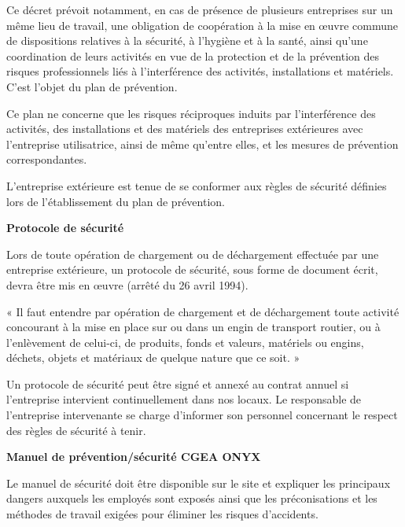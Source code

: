 Ce décret prévoit notamment, en cas de présence de plusieurs entreprises sur un même lieu de travail, une obligation de coopération à la mise en œuvre commune de dispositions relatives à la sécurité, à l’hygiène et à la santé, ainsi qu’une coordination de leurs activités en vue de la protection et de la prévention des risques professionnels liés à l’interférence des activités, installations et matériels. C’est l’objet du plan de prévention.

\vspace{0.3cm} 

Ce plan ne concerne que les risques réciproques induits par l’interférence des activités, des installations et des matériels des entreprises extérieures avec l’entreprise utilisatrice, ainsi de même qu’entre elles, et les mesures de prévention correspondantes. 
\vspace{0.3cm} 

L’entreprise extérieure est tenue de se conformer aux règles de sécurité définies lors de l’établissement du plan de prévention.


\vspace{0.3cm}
\textbf{	Protocole de sécurité}
\vspace{0.3cm}

Lors de toute opération de chargement ou de déchargement effectuée par une entreprise extérieure, un protocole de sécurité, sous forme de document écrit, devra être mis en œuvre (arrêté du 26 avril 1994). 
\vspace{0.3cm} 

« Il faut entendre par opération de chargement et de déchargement toute activité concourant à la mise en place sur ou dans un engin de transport routier, ou à l’enlèvement de celui-ci, de produits, fonds et valeurs, matériels ou engins, déchets, objets et matériaux de quelque nature que ce soit. »
\vspace{0.3cm} 

Un protocole de sécurité peut être signé et annexé au contrat annuel si l’entreprise intervient continuellement dans nos locaux. Le responsable de l’entreprise intervenante se charge d’informer son personnel concernant le respect des règles de sécurité à tenir.

\vspace{0.3cm}
\textbf{	Manuel de prévention/sécurité CGEA ONYX}
\vspace{0.3cm}


Le manuel de sécurité doit être disponible sur le site et expliquer les principaux dangers auxquels les employés sont exposés ainsi que les préconisations et les méthodes de travail exigées pour éliminer les risques d’accidents.


